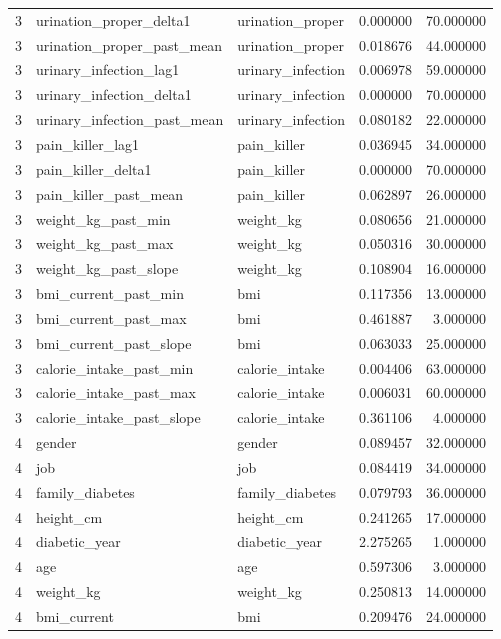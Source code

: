 \begin{longtable}{rllrr}
3 & urination\_proper\_delta1 & urination\_proper & 0.000000 & 70.000000 \\
3 & urination\_proper\_past\_mean & urination\_proper & 0.018676 & 44.000000 \\
3 & urinary\_infection\_lag1 & urinary\_infection & 0.006978 & 59.000000 \\
3 & urinary\_infection\_delta1 & urinary\_infection & 0.000000 & 70.000000 \\
3 & urinary\_infection\_past\_mean & urinary\_infection & 0.080182 & 22.000000 \\
3 & pain\_killer\_lag1 & pain\_killer & 0.036945 & 34.000000 \\
3 & pain\_killer\_delta1 & pain\_killer & 0.000000 & 70.000000 \\
3 & pain\_killer\_past\_mean & pain\_killer & 0.062897 & 26.000000 \\
3 & weight\_kg\_past\_min & weight\_kg & 0.080656 & 21.000000 \\
3 & weight\_kg\_past\_max & weight\_kg & 0.050316 & 30.000000 \\
3 & weight\_kg\_past\_slope & weight\_kg & 0.108904 & 16.000000 \\
3 & bmi\_current\_past\_min & bmi & 0.117356 & 13.000000 \\
3 & bmi\_current\_past\_max & bmi & 0.461887 & 3.000000 \\
3 & bmi\_current\_past\_slope & bmi & 0.063033 & 25.000000 \\
3 & calorie\_intake\_past\_min & calorie\_intake & 0.004406 & 63.000000 \\
3 & calorie\_intake\_past\_max & calorie\_intake & 0.006031 & 60.000000 \\
3 & calorie\_intake\_past\_slope & calorie\_intake & 0.361106 & 4.000000 \\
4 & gender & gender & 0.089457 & 32.000000 \\
4 & job & job & 0.084419 & 34.000000 \\
4 & family\_diabetes & family\_diabetes & 0.079793 & 36.000000 \\
4 & height\_cm & height\_cm & 0.241265 & 17.000000 \\
4 & diabetic\_year & diabetic\_year & 2.275265 & 1.000000 \\
4 & age & age & 0.597306 & 3.000000 \\
4 & weight\_kg & weight\_kg & 0.250813 & 14.000000 \\
4 & bmi\_current & bmi & 0.209476 & 24.000000 \\

\end{longtable}
